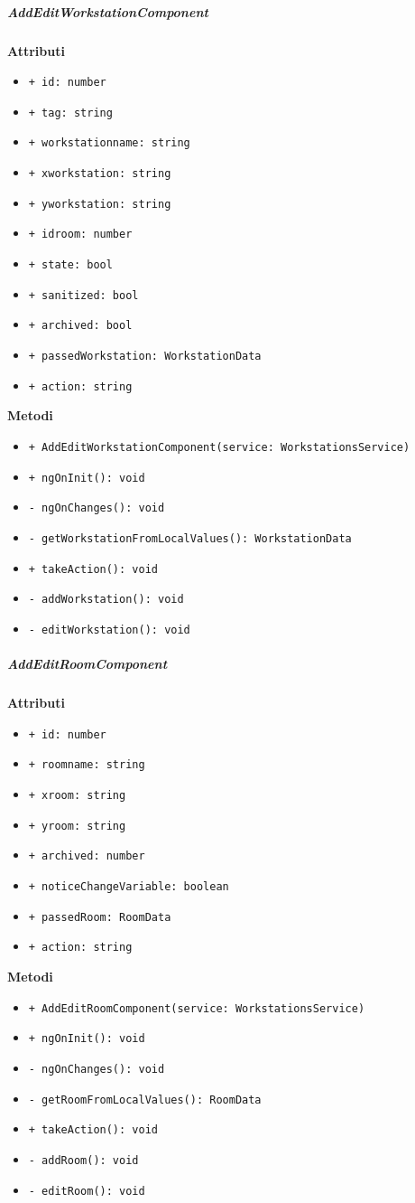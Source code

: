 \subparagraph{AddEditWorkstationComponent}
\textbf{Attributi}
\begin{itemize}
	\item \texttt{+ id: number } 
	\item \texttt{+ tag: string } 
	\item \texttt{+ workstationname: string } 
	\item \texttt{+ xworkstation: string } 
	\item \texttt{+ yworkstation: string } 
	\item \texttt{+ idroom: number } 
	\item \texttt{+ state: bool } 
	\item \texttt{+ sanitized: bool } 
	\item \texttt{+ archived: bool } 
	\item \texttt{+ passedWorkstation: WorkstationData } 
	\item \texttt{+ action: string} 
\end{itemize}
\textbf{Metodi}
\begin{itemize}
	\item \texttt{+ AddEditWorkstationComponent(service: WorkstationsService) }
	\item \texttt{+ ngOnInit(): void }
	\item \texttt{- ngOnChanges(): void }
	\item \texttt{- getWorkstationFromLocalValues(): WorkstationData }
	\item \texttt{+ takeAction(): void }
	\item \texttt{- addWorkstation(): void }
	\item \texttt{- editWorkstation(): void}
\end{itemize}
\subparagraph{AddEditRoomComponent}
\textbf{Attributi}
\begin{itemize}
	\item \texttt{+ id: number 	}
	\item \texttt{+ roomname: string 	}
	\item \texttt{+ xroom: string 	}
	\item \texttt{+ yroom: string 	}
	\item \texttt{+ archived: number 	}
	\item \texttt{+ noticeChangeVariable: boolean 	}
	\item \texttt{+ passedRoom: RoomData 	}
	\item \texttt{+ action: string}
\end{itemize}
\textbf{Metodi}
\begin{itemize}
	\item \texttt{+ AddEditRoomComponent(service: WorkstationsService) 	}
	\item \texttt{+ ngOnInit(): void 	}
	\item \texttt{- ngOnChanges(): void 	}
	\item \texttt{- getRoomFromLocalValues(): RoomData 	}
	\item \texttt{+ takeAction(): void 	}
	\item \texttt{- addRoom(): void 	}
	\item \texttt{- editRoom(): void}
\end{itemize}

